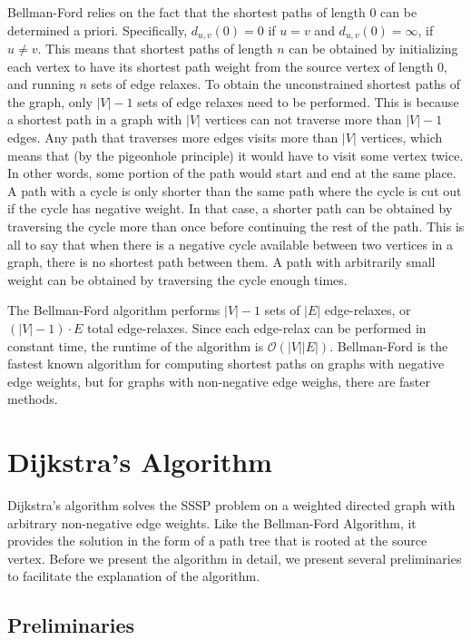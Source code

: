 \documentclass[12pt,twoside]{reedthesis}
\begin{document}
Bellman-Ford relies on the fact that the shortest paths of length 0 can be determined a priori. Specifically, $d_{u,v}(0) = 0$ if $u = v$ and $d_{u,v}(0) = \infty$,  if $u \neq v$. This means that shortest paths of length $n$ can be obtained by initializing each vertex to have its shortest path weight from the source vertex of length 0, and running $n$ sets of edge relaxes. To obtain the unconstrained shortest paths of the graph, only $|V|-1$ sets of edge relaxes need to be performed. This is because a shortest path in a graph with $|V|$ vertices can not traverse more than $|V|-1$ edges. Any path that traverses more edges visits more than $|V|$ vertices, which means that (by the pigeonhole principle) it would have to visit some vertex twice. In other words, some portion of the path would start and end at the same place. A path with a cycle is only shorter than the same path where the cycle is cut out if the cycle has negative weight. In that case, a shorter path can be obtained by traversing the cycle more than once before continuing the rest of the path. This is all to say that when there is a negative cycle available between two vertices in a graph, there is no shortest path between them. A path with arbitrarily small weight can be obtained by traversing the cycle enough times.

The Bellman-Ford algorithm performs $|V| - 1$ sets of $|E|$ edge-relaxes, or $(|V| - 1)\cdot E$ total edge-relaxes. Since each edge-relax can be performed in constant time, the runtime of the algorithm is $\mathcal{O}(|V||E|)$. Bellman-Ford is the fastest known algorithm for computing shortest paths on graphs with negative edge weights, but for graphs with non-negative edge weighs, there are faster methods.

\section{Dijkstra's Algorithm}

Dijkstra's algorithm solves the SSSP problem on a weighted directed graph with arbitrary non-negative edge weights. Like the Bellman-Ford Algorithm, it provides the solution in the form of a path tree that is rooted at the source vertex. Before we present the algorithm in detail, we present several preliminaries to facilitate the explanation of the algorithm.

\subsection{Preliminaries}
\end{document}
